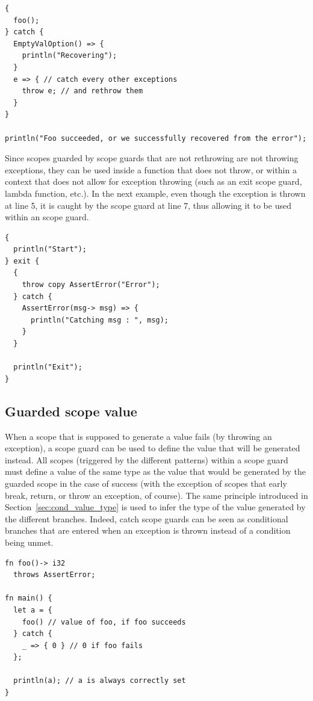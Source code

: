 \begin{lstlisting}[style=coloredverbatim]
{
  foo();
} catch {
  EmptyValOption() => {
    println("Recovering");
  }
  e => { // catch every other exceptions
    throw e; // and rethrow them
  }
}

println("Foo succeeded, or we successfully recovered from the error");
\end{lstlisting}

Since scopes guarded by  scope guards that are not rethrowing are
not throwing exceptions, they can be used inside a function that does not throw,
or within a context that does not allow for exception throwing (such as an exit
scope guard, lambda function, etc.). In the next example, even though the
exception  is thrown at line 5, it is caught by the scope
guard at line 7, thus allowing it to be used within an  scope guard.

\begin{lstlisting}[style=coloredverbatim]
{
  println("Start");
} exit {
  {
    throw copy AssertError("Error");
  } catch {
    AssertError(msg-> msg) => {
      println("Catching msg : ", msg);
    }
  }

  println("Exit");
}
\end{lstlisting}

\subsection{Guarded scope value}

When a scope that is supposed to generate a value fails (by throwing an
exception), a  scope guard can be used to define the value that
will be generated instead. All scopes (triggered by the different patterns)
within a  scope guard must define a value of the same type as the
value that would be generated by the guarded scope in the case of success (with
the exception of scopes that early break, return, or throw an exception, of
course). The same principle introduced in Section~\ref{sec:cond_value_type} is
used to infer the type of the value generated by the different branches. Indeed,
catch scope guards can be seen as  conditional branches that are
entered when an exception is thrown instead of a condition being unmet.

\begin{lstlisting}[style=coloredverbatim]
fn foo()-> i32
  throws AssertError;

fn main() {
  let a = {
    foo() // value of foo, if foo succeeds
  } catch {
    _ => { 0 } // 0 if foo fails
  };

  println(a); // a is always correctly set
}
\end{lstlisting}


